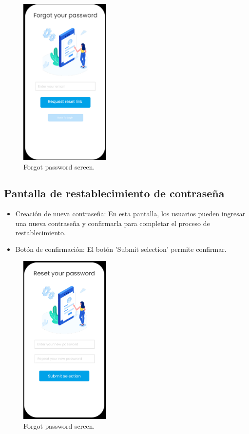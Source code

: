 \documentclass[letterpaper, 12pt]{report}
\begin{document}
\begin{figure}[H]
\centering
\includegraphics[width=0.4\textwidth]{figure12.png}
\caption{Forgot password screen.}
\label{fig:1}
\end{figure}

\subsection{Pantalla de restablecimiento de contraseña}

\begin{itemize}
    \item Creación de nueva contraseña: En esta pantalla, los usuarios pueden ingresar una nueva contraseña y confirmarla para completar el proceso de restablecimiento.
    \item Botón de confirmación: El botón 'Submit selection' permite confirmar.
\end{itemize}

\begin{figure}[H]
\centering
\includegraphics[width=0.4\textwidth]{figure13.png}
\caption{Forgot password screen.}
\label{fig:1}
\end{figure}
\end{document}
